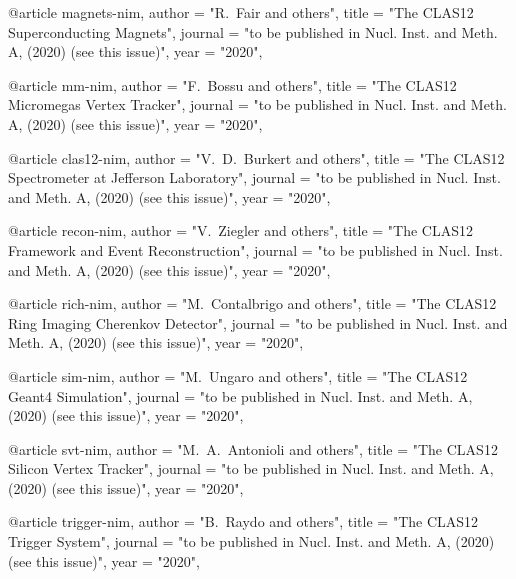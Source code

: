 @article{
magnets-nim,
author         = "R.~Fair and others",
title          = "{The CLAS12 Superconducting Magnets}",
journal        = "to be published in Nucl. Inst. and Meth. A, (2020) (see this issue)",
year           = "2020",
}

@article{
mm-nim,
author         = "F.~Bossu and others",
title          = "{The CLAS12 Micromegas Vertex Tracker}",
journal        = "to be published in Nucl. Inst. and Meth. A, (2020) (see this issue)",
year           = "2020",
}

@article{
clas12-nim,
author         = "V.~D.~Burkert and others",
title          = "{The CLAS12 Spectrometer at Jefferson Laboratory}",
journal        = "to be published in Nucl. Inst. and Meth. A, (2020) (see this issue)",
year           = "2020",
}

@article{
recon-nim,
author         = "V.~Ziegler and others",
title          = "{The CLAS12 Framework and Event Reconstruction}",
journal        = "to be published in Nucl. Inst. and Meth. A, (2020) (see this issue)",
year           = "2020",
}

@article{
rich-nim,
author         = "M.~Contalbrigo and others",
title          = "{The CLAS12 Ring Imaging Cherenkov Detector}",
journal        = "to be published in Nucl. Inst. and Meth. A, (2020) (see this issue)",
year           = "2020",
}

@article{
sim-nim,
author         = "M.~Ungaro and others",
title          = "{The CLAS12 Geant4 Simulation}",
journal        = "to be published in Nucl. Inst. and Meth. A, (2020) (see this issue)",
year           = "2020",
}

@article{
svt-nim,
author         = "M.~A.~Antonioli and others",
title          = "{The CLAS12 Silicon Vertex Tracker}",
journal        = "to be published in Nucl. Inst. and Meth. A, (2020) (see this issue)",
year           = "2020",
}

@article{
trigger-nim,
author         = "B.~Raydo and others",
title          = "{The CLAS12 Trigger System}",
journal        = "to be published in Nucl. Inst. and Meth. A, (2020) (see this issue)",
year           = "2020",
}

